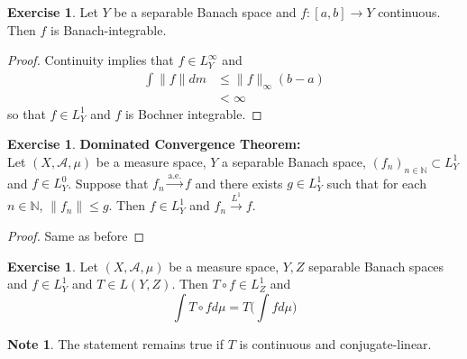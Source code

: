 \documentclass[12pt]{amsart}
\theoremstyle{definition}
\newtheorem{note}[definition]{Note}
\newtheorem{ex}[definition]{Exercise}
\newcommand{\N}{\mathbb{N}}
\newcommand{\MA}{\mathcal{A}}
\newcommand{\convt}[1]{\xrightarrow{\text{#1}}}
\newcommand{\conv}[1]{\xrightarrow{#1}}
\newcommand{\lex}[1]{\label{ex:#1}}
\begin{document}
	\begin{ex} \lex{00000} 
	Let $Y$ be a separable Banach space and $f:[a,b] \rightarrow Y$ continuous. Then $f$ is Banach-integrable.
	\end{ex}
	
	\begin{proof}
	Continuity implies that $f \in L_Y^{\infty}$ and 
	\begin{align*}
	\int \| f \| dm 
	&\leq \| f\|_{\infty}(b-a) \\
	&< \infty
\end{align*}
	so that $f \in L^1_Y$ and $f$ is Bochner integrable.
\end{proof}			
	
	\begin{ex} \textbf{Dominated Convergence Theorem:}\\ \lex{00000} 
	Let $(X, \MA, \mu)$ be a measure space, $Y$ a separable Banach space, $(f_n)_{n \in \N} \subset L^1_Y$ and $f \in L^0_Y$. Suppose that $f_n \convt{a.e.} f$ and there exists $g \in L^1_Y$ such that for each $n \in \N$, $\|f_n\| \leq g$. Then $f \in L^1_Y$ and $f_n \conv{L^1} f$. 
	\end{ex}
	
	\begin{proof}
	Same as before
	\end{proof}		
	
	\begin{ex} \lex{00000} 
	Let $(X, \MA, \mu)$ be a measure space, $Y,Z$ separable Banach spaces and $f \in L^1_Y$ and $T \in L(Y,Z)$. Then $T \circ f \in L^1_Z$ and $$\int T \circ f d \mu = T\bigg( \int f d\mu \bigg)$$
	\end{ex}
	
	\begin{note}
	The statement remains true if $T$ is continuous and conjugate-linear. 
	\end{note}
	
\end{document}
